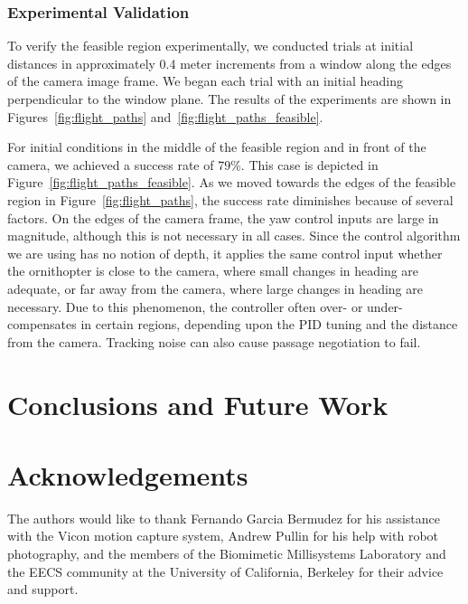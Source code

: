 \documentclass{aamas2013}
\begin{document}
\subsubsection{Experimental Validation}
To verify the feasible region experimentally, we conducted trials at initial
distances in approximately 0.4 meter increments from a window along the
edges of the camera image frame. We began each trial with an initial heading
perpendicular to the window plane. The results of the experiments are shown in
Figures~\ref{fig:flight_paths} and~\ref{fig:flight_paths_feasible}.

For initial conditions in the middle of the feasible region and in front of
the camera, we achieved a success rate of 79\%. This case is depicted in
Figure~\ref{fig:flight_paths_feasible}. As we moved towards the edges of the
feasible region in Figure~\ref{fig:flight_paths}, the success rate diminishes
because of several factors. On the edges of the camera frame, the yaw control
inputs are large in magnitude, although this is not necessary in all cases.
Since the control algorithm we are using has no notion of depth, it applies
the same control input whether the ornithopter is close to the camera, where
small changes in heading are adequate, or far away from the camera, where
large changes in heading are necessary. Due to this phenomenon, the controller
often over- or under-compensates in certain regions, depending upon the PID
tuning and the distance from the camera. Tracking noise can also cause passage
negotiation to fail.

\section{Conclusions and Future Work}
\section{Acknowledgements}
The authors would like to thank Fernando Garcia Bermudez for his 
assistance with the Vicon motion capture system, Andrew Pullin for his 
help with robot photography, and the members of the Biomimetic 
Millisystems Laboratory and the EECS community at the University of 
California, Berkeley for their advice and support.

\end{document}
